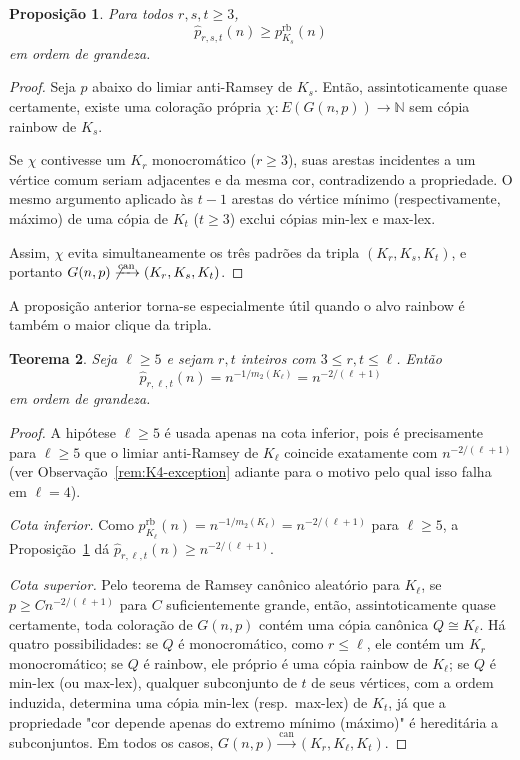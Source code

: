 \documentclass[reqno, 12pt]{amsart}
\numberwithin{equation}{section}
\theoremstyle{plain}
\newtheorem{theorem}{Teorema}[section]
\newtheorem{proposition}[theorem]{Proposição}
\theoremstyle{definition}
\begin{document}
\begin{proposition}
  \label{prop:antiramsey-lower-bound}
  Para todos $r,s,t\geq3$,
  \[
    \widehat p_{r,s,t}(n)
    \geq
    p^{\mathrm{rb}}_{K_s}(n)
  \]
  em ordem de grandeza.
\end{proposition}

\begin{proof}
  Seja $p$ abaixo do limiar anti-Ramsey de $K_s$. Então,
  assintoticamente quase certamente, existe uma coloração própria
  $\chi:E(G(n,p))\to\mathbb{N}$ sem cópia rainbow de $K_s$.

  Se $\chi$ contivesse um $K_r$ monocromático ($r\geq3$), suas
  arestas incidentes a um vértice comum seriam adjacentes e da
  mesma cor, contradizendo a propriedade. O mesmo argumento aplicado
  às $t-1$ arestas do vértice mínimo (respectivamente, máximo) de
  uma cópia de $K_t$ ($t\geq3$) exclui cópias min-lex e max-lex.

  Assim, $\chi$ evita simultaneamente os três padrões da tripla
  $(K_r,K_s,K_t)$, e portanto
  $G(n,p)\not\xrightarrow{\mathrm{can}}(K_r,K_s,K_t)$.
\end{proof}

A proposição anterior torna-se especialmente útil quando o alvo
rainbow é também o maior clique da tripla.

\begin{theorem}
  \label{thm:rainbow-largest}
  Seja $\ell\geq5$ e sejam $r,t$ inteiros com $3\leq r,t\leq\ell$.
  Então
  \[
    \widehat p_{r,\ell,t}(n)
    =
    n^{-1/m_2(K_\ell)}
    =
    n^{-2/(\ell+1)}
  \]
  em ordem de grandeza.
\end{theorem}

\begin{proof}
  A hipótese $\ell\geq5$ é usada apenas na cota inferior, pois é
  precisamente para $\ell\geq5$ que o limiar anti-Ramsey de $K_\ell$
  coincide exatamente com $n^{-2/(\ell+1)}$ (ver
  Observação~\ref{rem:K4-exception} adiante para o motivo pelo qual
  isso falha em $\ell=4$).

  \emph{Cota inferior.} Como $p^{\mathrm{rb}}_{K_\ell}(n)=
    n^{-1/m_2(K_\ell)}=n^{-2/(\ell+1)}$ para $\ell\geq5$, a
  Proposição~\ref{prop:antiramsey-lower-bound} dá
  $\widehat p_{r,\ell,t}(n)\geq n^{-2/(\ell+1)}$.

  \emph{Cota superior.} Pelo teorema de Ramsey canônico aleatório
  para $K_\ell$, se $p\geq Cn^{-2/(\ell+1)}$ para $C$
  suficientemente grande, então, assintoticamente quase certamente,
  toda coloração de $G(n,p)$ contém uma cópia canônica
  $Q\cong K_\ell$. Há quatro possibilidades: se $Q$ é
  monocromático, como $r\leq\ell$, ele contém um $K_r$
  monocromático; se $Q$ é rainbow, ele próprio é uma cópia rainbow
  de $K_\ell$; se $Q$ é min-lex (ou max-lex), qualquer subconjunto
  de $t$ de seus vértices, com a ordem induzida, determina uma
  cópia min-lex (resp.\ max-lex) de $K_t$, já que a propriedade
  "cor depende apenas do extremo mínimo (máximo)" é hereditária a
  subconjuntos. Em todos os casos, $G(n,p)\xrightarrow{\mathrm{can}}
    (K_r,K_\ell,K_t)$.
\end{proof}
\end{document}
